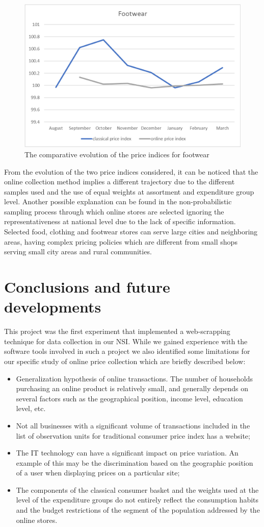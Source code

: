 \documentclass[]{article}
\begin{document}
\begin{figure}
	\centering
	\includegraphics[width=0.7\linewidth]{fig5.eps}
	\caption{The comparative evolution of the price indices for footwear}
	\label{fig:5}
\end{figure}


From the evolution of the two price indices considered, it can be noticed that the online 
collection method implies a different trajectory due to the different samples used and the use 
of equal weights at assortment and expenditure group level. Another possible explanation can be found 
in the non-probabilistic sampling process through which online stores are selected ignoring the 
representativeness at national level due to the lack of specific information. Selected food, 
clothing and footwear stores can serve large cities and neighboring areas, having complex pricing 
policies which are different from small shops serving small city areas and rural communities.


\section{Conclusions and future developments}

This project was the first experiment that implemented a web-scrapping technique for data collection 
in our NSI. While we gained experience with the software tools involved in such a project we also 
identified some limitations for our specific study of online price collection which are briefly described below:
\begin{itemize}
	\item Generalization hypothesis of online transactions. The number of households purchasing an 
	online product is relatively small, and generally depends on several factors such as the geographical position, 
	income level, education level, etc.
	\item Not all businesses with a significant volume of transactions included in the list of observation 
	units for traditional consumer price index has a website;
	\item The IT technology can have a significant impact on price variation. An example of this may be the discrimination 
	based on the geographic position of a user when displaying prices on a particular site;
	\item The components of the classical consumer basket and the weights used at the level of the expenditure groups do not entirely reflect the consumption habits and the budget restrictions of the segment of the population addressed by the online stores.
\end{itemize}
\end{document}
